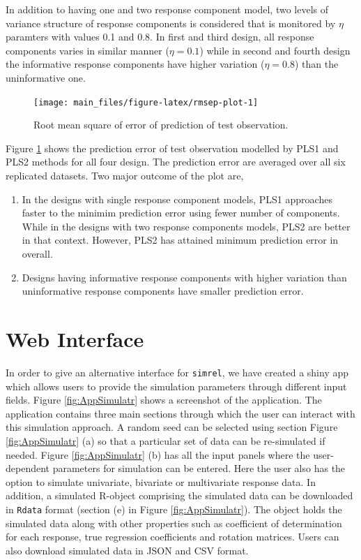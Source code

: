 \documentclass[review]{elsarticle}
\providecommand{\tightlist}{%
  \setlength{\itemsep}{0pt}\setlength{\parskip}{0pt}}
\theoremstyle{definition}
\theoremstyle{definition}
\theoremstyle{definition}
\theoremstyle{remark}
\begin{document}
In addition to having one and two response component model, two levels
of variance structure of response components is considered that is
monitored by \(\eta\) paramters with values 0.1 and 0.8. In first and
third design, all response components varies in similar manner
(\(\eta = 0.1\)) while in second and fourth design the informative
response components have higher variation (\(\eta = 0.8\)) than the
uninformative one.

\begin{figure}[H]
\texttt{[image: main\_files/figure-latex/rmsep-plot-1]} \caption{Root mean square of error of prediction of test observation.}\label{fig:rmsep-plot}
\end{figure}

Figure \ref{fig:rmsep-plot} shows the prediction error of test
observation modelled by PLS1 and PLS2 methods for all four design. The
prediction error are averaged over all six replicated datasets. Two
major outcome of the plot are,

\begin{enumerate}
\def\labelenumi{\arabic{enumi})}
\tightlist
\item
  In the designs with single response component models, PLS1 approaches
  faster to the minimim prediction error using fewer number of
  components. While in the designs with two response components models,
  PLS2 are better in that context. However, PLS2 has attained minimum
  prediction error in overall.
\item
  Designs having informative response components with higher variation
  than uninformative response components have smaller prediction error.
\end{enumerate}

\hypertarget{web-interface}{\section{Web
Interface}\label{web-interface}}

In order to give an alternative interface for \texttt{simrel}, we have
created a shiny app which allows users to provide the simulation
parameters through different input fields. Figure \ref{fig:AppSimulatr}
shows a screenshot of the application. The application contains three
main sections through which the user can interact with this simulation
approach. A random seed can be selected using section Figure
\ref{fig:AppSimulatr} (a) so that a particular set of data can be
re-simulated if needed. Figure \ref{fig:AppSimulatr} (b) has all the
input panels where the user-dependent parameters for simulation can be
entered. Here the user also has the option to simulate univariate,
bivariate or multivariate response data. In addition, a simulated
R-object comprising the simulated data can be downloaded in
\texttt{Rdata} format (section (e) in Figure \ref{fig:AppSimulatr}). The
object holds the simulated data along with other properties such as
coefficient of determination for each response, true regression
coefficients and rotation matrices. Users can also download simulated
data in JSON and CSV format.
\end{document}
